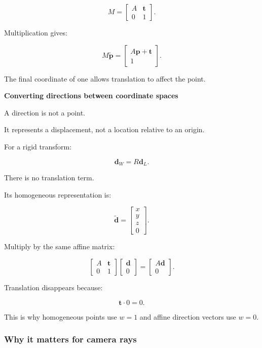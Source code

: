 \[
 M= \begin{bmatrix} A&\mathbf t\\ 0&1 \end{bmatrix}.
\]

Multiplication gives:

\[
 M\tilde{\mathbf p}= \begin{bmatrix} A\mathbf p+\mathbf t\\1 \end{bmatrix}.
\]

The final coordinate of one allows translation to affect the point.

\textbf{Converting directions between coordinate spaces}

A direction is not a point.

It represents a displacement, not a location relative to an origin.

For a rigid transform:

\[
 \boxed{ \mathbf d_W=R\mathbf d_L }.
\]

There is no translation term.

Its homogeneous representation is:

\[
 \boxed{ \tilde{\mathbf d}= \begin{bmatrix}x\\y\\z\\0\end{bmatrix} }.
\]

Multiply by the same affine matrix:

\[
 \begin{bmatrix} A&\mathbf t\\ 0&1 \end{bmatrix} \begin{bmatrix} \mathbf d\\0 \end{bmatrix} = \begin{bmatrix} A\mathbf d\\0 \end{bmatrix}.
\]

Translation disappears because:

\[
 \mathbf t\cdot0=0.
\]

This is why homogeneous points use \(w=1\) and affine direction vectors use \(w=0\).

\subsubsection{Why it matters for camera rays}\label{02-foundations-ii-ch032-why-it-matters-for-camera-rays}

